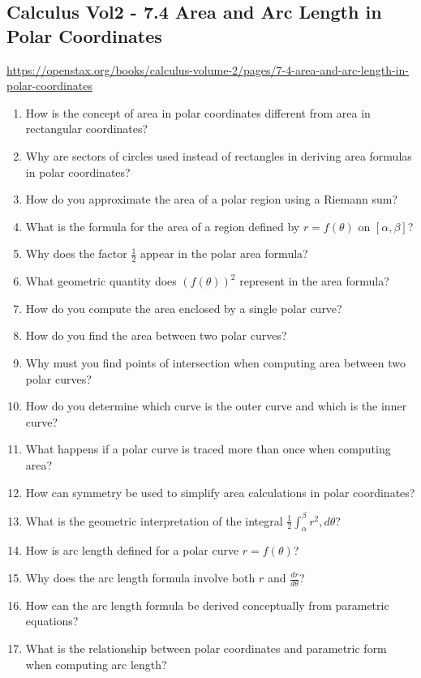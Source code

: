 \subsection{Calculus Vol2 - 7.4 Area and Arc Length in Polar Coordinates}

\url{https://openstax.org/books/calculus-volume-2/pages/7-4-area-and-arc-length-in-polar-coordinates}

\begin{enumerate}
  \item How is the concept of area in polar coordinates different from area in rectangular coordinates?
  \item Why are sectors of circles used instead of rectangles in deriving area formulas in polar coordinates?
  \item How do you approximate the area of a polar region using a Riemann sum?
  \item What is the formula for the area of a region defined by \(r = f(\theta)\) on \([\alpha, \beta]\)?
  \item Why does the factor \(\frac{1}{2}\) appear in the polar area formula?
  \item What geometric quantity does \((f(\theta))^{2}\) represent in the area formula?
  \item How do you compute the area enclosed by a single polar curve?
  \item How do you find the area between two polar curves?
  \item Why must you find points of intersection when computing area between two polar curves?
  \item How do you determine which curve is the outer curve and which is the inner curve?
  \item What happens if a polar curve is traced more than once when computing area?
  \item How can symmetry be used to simplify area calculations in polar coordinates?
  \item What is the geometric interpretation of the integral \(\frac{1}{2}\int_{\alpha}^{\beta} r^{2},d\theta\)?
  \item How is arc length defined for a polar curve \(r = f(\theta)\)?
  \item Why does the arc length formula involve both \(r\) and \(\frac{dr}{d\theta}\)?
  \item How can the arc length formula be derived conceptually from parametric equations?
  \item What is the relationship between polar coordinates and parametric form when computing arc length?

\end{enumerate}
